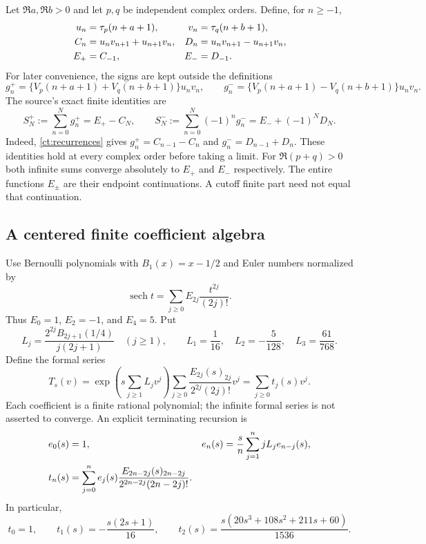 Let $\Re a,\Re b>0$ and let $p,q$ be independent complex orders. Define,
for $n\ge-1$,
\begin{align}
 u_n&=\tau_p(n+a+1),&v_n&=\tau_q(n+b+1),\notag\\
 C_n&=u_nv_{n+1}+u_{n+1}v_n,&
 D_n&=u_nv_{n+1}-u_{n+1}v_n,\label{ct:CD}\\
 E_+&=C_{-1},&E_-&=D_{-1}.\notag
\end{align}
For later convenience, the signs are kept outside the definitions
\[
 g_n^+=\{V_p(n+a+1)+V_q(n+b+1)\}u_nv_n,
 \qquad
 g_n^-=\{V_p(n+a+1)-V_q(n+b+1)\}u_nv_n.
\]
The source's exact finite identities are
\begin{equation}\label{ct:finite}
 S_N^+:=\sum_{n=0}^N g_n^+=E_+-C_N,
 \qquad
 S_N^-:=\sum_{n=0}^N(-1)^ng_n^-=E_-+(-1)^ND_N.
\end{equation}
Indeed, \eqref{ct:recurrences} gives
$g_n^+=C_{n-1}-C_n$ and $g_n^-=D_{n-1}+D_n$.
These identities hold at every complex order before taking a limit.
For $\Re(p+q)>0$ both infinite sums converge absolutely to $E_+$ and
$E_-$ respectively. The entire functions $E_\pm$ are their endpoint
continuations. A cutoff finite part need not equal that continuation.

\subsection{A centered finite coefficient algebra}

Use Bernoulli polynomials with $B_1(x)=x-1/2$ and Euler numbers normalized by
\[
 \operatorname{sech}t=\sum_{j\ge0}E_{2j}\frac{t^{2j}}{(2j)!}.
\]
Thus $E_0=1$, $E_2=-1$, and $E_4=5$. Put
\begin{equation}\label{ct:Lj}
 L_j=\frac{2^{2j}B_{2j+1}(1/4)}{j(2j+1)}\quad(j\ge1),
 \qquad L_1=\frac1{16},\quad L_2=-\frac5{128},\quad L_3=\frac{61}{768}.
\end{equation}
Define the formal series
\begin{equation}\label{ct:Tformal}
 T_s(v)=\exp\left(s\sum_{j\ge1}L_jv^j\right)
       \sum_{j\ge0}\frac{E_{2j}(s)_{2j}}{2^{2j}(2j)!}v^j
       =\sum_{j\ge0}t_j(s)v^j.
\end{equation}
Each coefficient is a finite rational polynomial; the infinite formal
series is not asserted to converge. An explicit terminating recursion is
\begin{align}
 e_0(s)&=1,&
 e_n(s)&=\frac{s}{n}\sum_{j=1}^n jL_je_{n-j}(s),\label{ct:recursion}\\
 t_n(s)&=\sum_{j=0}^ne_j(s)
       \frac{E_{2n-2j}(s)_{2n-2j}}{2^{2n-2j}(2n-2j)!}.\notag
\end{align}
In particular,
\begin{equation}\label{ct:first-t}
 t_0=1,\qquad t_1(s)=-\frac{s(2s+1)}{16},\qquad
 t_2(s)=\frac{s(20s^3+108s^2+211s+60)}{1536}.
\end{equation}

